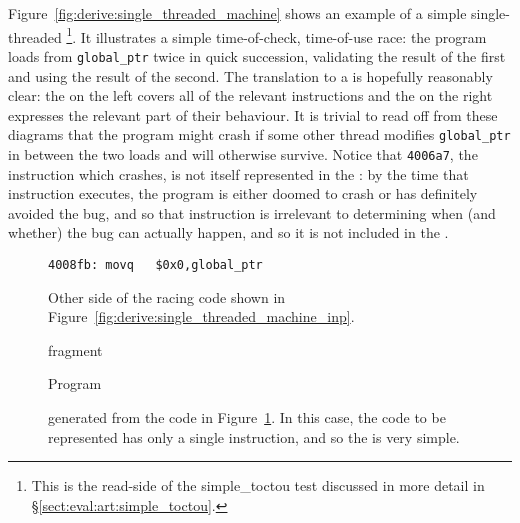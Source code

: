 Figure~\ref{fig:derive:single_threaded_machine} shows an example of a
simple single-threaded \StateMachine\footnote{This is the read-side of
  the simple\_toctou test discussed in more detail in
  \S\ref{sect:eval:art:simple_toctou}.}.  It illustrates a simple
time-of-check, time-of-use race: the program loads from
\verb|global_ptr| twice in quick succession, validating the result of
the first and using the result of the second.  The translation to a
{\StateMachine} is hopefully reasonably clear: the  on
the left covers all of the relevant instructions and the
 on the right expresses the relevant part of their
behaviour.  It is trivial to read off from these diagrams that the
program might crash if some other thread modifies \verb|global_ptr| in
between the two loads and will otherwise survive.  Notice that
\verb|4006a7|, the instruction which crashes, is not itself
represented in the : by the time that instruction
executes, the program is either doomed to crash or has definitely
avoided the bug, and so that instruction is irrelevant to determining
when (and whether) the bug can actually happen, and so it is not
included in the {\StateMachine}.

\begin{figure}[t]
\begin{verbatim}
4008fb: movq   $0x0,global_ptr
\end{verbatim}
\caption{Other side of the racing code shown in Figure~\ref{fig:derive:single_threaded_machine_inp}.}
\label{fig:derive:single_threaded_machine_write_inp}
\end{figure}

\begin{figure}[t]
  \begin{minipage}{50mm}
    \begin{subfloat}
      \vspace{-20mm}\caption{ fragment}
    \end{subfloat}
  \end{minipage}
  \begin{subfloat}
    \begin{minipage}{70mm}
    \end{minipage}
    \caption{Program }
  \end{subfloat}
  \caption{{\STateMachine} generated from the code in
    Figure~\ref{fig:derive:single_threaded_machine_write_inp}.  In
    this case, the code to be represented has only a single
    instruction, and so the {\StateMachine} is very
    simple.}
  \label{fig:derive:single_threaded_machine_write}
\end{figure}

